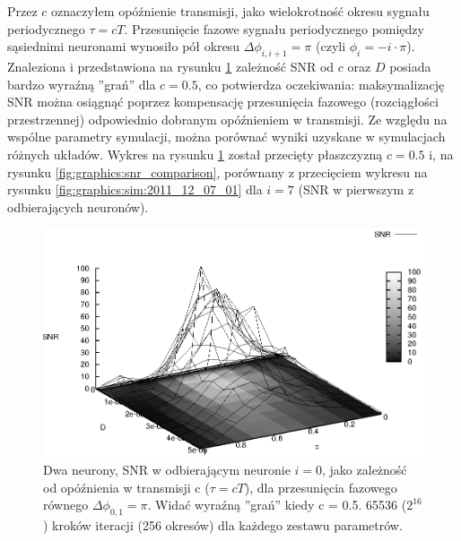   Przez $c$ oznaczyłem opóźnienie transmisji, jako wielokrotność okresu sygnału periodycznego $\tau = c T$. Przesunięcie fazowe sygnału periodycznego pomiędzy sąsiednimi neuronami wynosiło pół okresu $\Delta \phi_{i,i+1} = \pi$ (czyli $\phi_i = -i \cdot \pi$).
  Znaleziona i przedstawiona na rysunku \ref{fig:graphics:snr_c_d_3d} zależność SNR od $c$ oraz $D$ posiada bardzo wyraźną ''grań'' dla $c=0.5$, co potwierdza oczekiwania: maksymalizację SNR można osiągnąć poprzez kompensację przesunięcia fazowego (rozciągłości przestrzennej) odpowiednio dobranym opóźnieniem w transmisji.
  Ze względu na wspólne parametry symulacji, można porównać wyniki uzyskane w symulacjach różnych układów. Wykres na rysunku \ref{fig:graphics:snr_c_d_3d} został przecięty płaszczyzną $c=0.5$ i, na rysunku \ref{fig:graphics:snr_comparison}, porównany z przecięciem wykresu na rysunku \ref{fig:graphics:sim:2011_12_07_01} dla $i=7$ (SNR w pierwszym z odbierających neuronów).

  \begin{figure}
    \includegraphics[width=140mm]{images/2neuron/3d_2}
    \caption{Dwa neurony, SNR w odbierającym neuronie $i=0$, jako zależność od opóźnienia w transmisji c ($\tau = c T$), dla przesunięcia fazowego równego $\Delta \phi_{0,1} = \pi$. Widać wyraźną ''grań'' kiedy c = 0.5. 65536 ($2^{16}$) kroków iteracji (256 okresów) dla każdego zestawu parametrów.}
    \label{fig:graphics:snr_c_d_3d}
  \end{figure}

